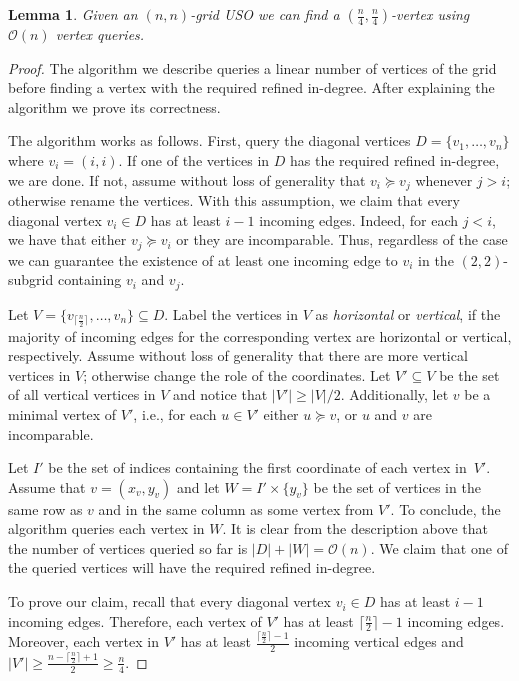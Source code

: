 \documentclass[a4paper,10pt]{article}
\newtheorem{lemma}{Lemma}
\newcommand{\indegree}{refined in-degree\xspace}
\begin{document}
\begin{lemma}
\label{lem:seed_lemma_for_square_matrices}
 Given an $(n, n)$-grid USO we can find a $(\frac{n}{4}, \frac{n}{4})$-vertex using $\mathcal{O}(n)$ vertex queries.
\end{lemma}

\begin{proof}
The algorithm we describe queries a linear number of vertices of the grid before finding a vertex with the required \indegree. 
After explaining the algorithm we prove its correctness.
  
The algorithm works as follows. First, query the diagonal vertices $D = \{v_1,\ldots, v_n\}$ where $v_i = (i,i)$. If one of the vertices in $D$ has the required \indegree, we are done. If not, assume without loss of generality that $v_i \succeq v_j$ whenever $j > i$; otherwise rename the vertices. 
With this assumption, we claim that every diagonal vertex $v_i \in D$ has at least $i - 1$ incoming edges. Indeed, for each $j < i$, we have that either $v_j \succeq v_i$ or they are incomparable. Thus, regardless of the case we can guarantee the existence of at least one incoming edge to $v_i$ in the $(2, 2)$-subgrid containing $v_i$ and $v_j$. 

Let $V = \{v_{\lceil \frac{n}{2} \rceil},\ldots,v_n\} \subseteq D$.
Label the vertices in $V$ as \emph{horizontal}  or \emph{vertical}, if the majority of incoming edges for the corresponding vertex are horizontal  or vertical, respectively. 
Assume without loss of generality that there are more vertical vertices in $V$; otherwise change the role of the coordinates. 
Let $V' \subseteq V$ be the set of all vertical vertices in $V$ and notice that $|V'| \geq |V|/2$.
 Additionally, let $v$ be a minimal vertex of $V'$, i.e., for each $u\in V'$ either $u\succeq v$, or $u$ and $v$ are incomparable. 

Let $I'$ be the set of indices containing the first coordinate of each vertex in~$V'$.
Assume that $v = (x_v, y_v)$ and let $W = I'\times \{y_v\}$ be the set of vertices in the same row as $v$ and in the same column as some vertex from $V'$.
To conclude, the algorithm queries each vertex in $W$.
It is clear from the description above that the number of vertices queried so far is $|D| + |W| = \mathcal{O}(n)$. 
We claim that one of the queried vertices will have the required \indegree.

To prove our claim, recall that every diagonal vertex $v_i \in D$ has at least $i - 1$ incoming edges.  
Therefore, each vertex of $V'$ has at least $\lceil \frac{n}{2} \rceil - 1$ incoming edges. 
Moreover, each vertex in $V'$ has at least $\frac{\lceil \frac{n}{2}\rceil-1}{2}$ incoming vertical edges and $|V'| \geq \frac{n-\lceil \frac{n}{2}\rceil + 1}{2} \geq \frac{n}{4}$. 


\end{proof}
\end{document}
